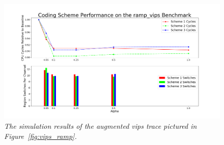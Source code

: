 \begin{figure}[htbp]
		\includegraphics[width=\linewidth]{fig/vips_ramp_results.png}
		\caption{\it{The simulation results of the augmented vips trace pictured in Figure~\ref{fig:vips_ramp}.}}
		\label{fig:vips_ramp_result}
\end{figure}


